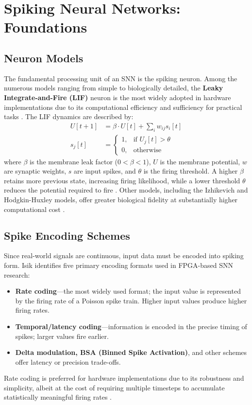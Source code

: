 \documentclass[12pt,a4paper]{article}
\begin{document}
\section{Spiking Neural Networks: Foundations}
\label{sec:foundations}

\subsection{Neuron Models}
The fundamental processing unit of an SNN is the spiking neuron. Among the numerous models ranging from simple to biologically detailed, the \textbf{Leaky Integrate-and-Fire (LIF)} neuron is the most widely adopted in hardware implementations due to its computational efficiency and sufficiency for practical tasks \cite{Isik2023}. The LIF dynamics are described by:
\begin{align}
    U[t+1] &= \beta \cdot U[t] + \sum_i w_{ij} s_i[t] \label{eq:lif}\\
    s_j[t] &= \begin{cases} 1, & \text{if } U_j[t] > \theta \\ 0, & \text{otherwise} \end{cases} \label{eq:spike}
\end{align}
where $\beta$ is the membrane leak factor ($0<\beta<1$), $U$ is the membrane potential, $w$ are synaptic weights, $s$ are input spikes, and $\theta$ is the firing threshold. A higher $\beta$ retains more previous state, increasing firing likelihood, while a lower threshold $\theta$ reduces the potential required to fire \cite{Neftci2019}. Other models, including the Izhikevich and Hodgkin-Huxley models, offer greater biological fidelity at substantially higher computational cost \cite{Schuman2017}.

\subsection{Spike Encoding Schemes}
Since real-world signals are continuous, input data must be encoded into spiking form. Isik \cite{Isik2023} identifies five primary encoding formats used in FPGA-based SNN research:
\begin{itemize}
    \item \textbf{Rate coding}---the most widely used format; the input value is represented by the firing rate of a Poisson spike train. Higher input values produce higher firing rates.
    \item \textbf{Temporal/latency coding}---information is encoded in the precise timing of spikes; larger values fire earlier.
    \item \textbf{Delta modulation, BSA (Binned Spike Activation)}, and other schemes offer latency or precision trade-offs.
\end{itemize}
Rate coding is preferred for hardware implementations due to its robustness and simplicity, albeit at the cost of requiring multiple timesteps to accumulate statistically meaningful firing rates \cite{Isik2023,Fang2023}.
\end{document}
